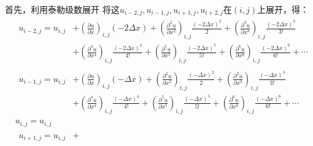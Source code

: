 首先，利用泰勒级数展开
将这$u_{i-2,j}, u_{i-1,j}, u_{i+1,j}, u_{i+2,j}$在$(i,j)$上展开，得：
\begin{equation}
  \begin{aligned}
    &\begin{aligned}
      u_{i-2,j}  =
      u_{i,j} &+
      \left(
        \frac{\partial u}{\partial x}
      \right)_{i,j}
      (-2\Delta x)
      +
      \left(
        \frac{\partial^{2} u}{\partial x^{2}}
      \right)_{i,j}
      \frac{(-2\Delta x)^{2}}{2}
      +
      \left(
        \frac{\partial^{3} u}{\partial x^{3}}
      \right)_{i,j}
      \frac{(-2\Delta x)^{3}}{3!}
      \\
              & 
              +
              \left(
                \frac{\partial^{4} u}{\partial x^{4}}
              \right)_{i,j}
              \frac{(-2\Delta x)^{4}}{4!}
              +
              \left(
                \frac{\partial^{5} u}{\partial x^{5}}
              \right)_{i,j}
              \frac{(-2\Delta x)^{5}}{5!}
              +
              \left(
                \frac{\partial^{6} u}{\partial x^{6}}
              \right)_{i,j}
              \frac{(-2\Delta x)^{6}}{6!}
              +
              \cdots
    \end{aligned}
    \\
    &\begin{aligned}
      u_{i-1,j}  =
      u_{i,j} &+
      \left(
        \frac{\partial u}{\partial x}
      \right)_{i,j}
      (-\Delta x)
      +
      \left(
        \frac{\partial^{2} u}{\partial x^{2}}
      \right)_{i,j}
      \frac{(-\Delta x)^{2}}{2}
      +
      \left(
        \frac{\partial^{3} u}{\partial x^{3}}
      \right)_{i,j}
      \frac{(-\Delta x)^{3}}{3!}
      \\
              & 
              +
              \left(
                \frac{\partial^{4} u}{\partial x^{4}}
              \right)_{i,j}
              \frac{(-\Delta x)^{4}}{4!}
              +
              \left(
                \frac{\partial^{5} u}{\partial x^{5}}
              \right)_{i,j}
              \frac{(-\Delta x)^{5}}{5!}
              +
              \left(
                \frac{\partial^{6} u}{\partial x^{6}}
              \right)_{i,j}
              \frac{(-\Delta x)^{6}}{6!}
              +
              \cdots
    \end{aligned}
    \\
    &u_{i,j} = u_{i, j}
    \\
    &\begin{aligned}
      u_{i+1,j}  =
      u_{i,j} &+

\end{aligned}
\end{aligned}
\end{equation}
